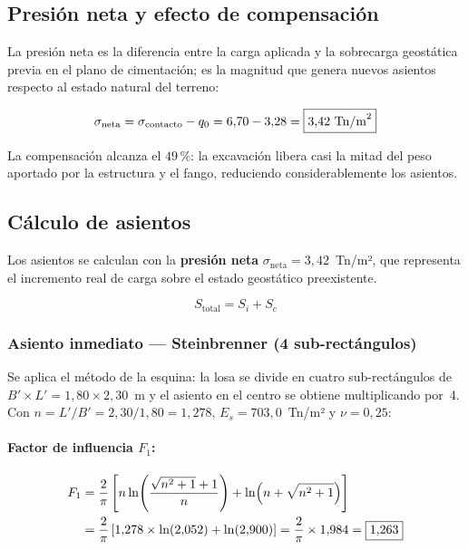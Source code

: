 \subsection{Presión neta y efecto de compensación}
\label{subsec:presion_neta}

La presión neta es la diferencia entre la carga aplicada y la sobrecarga
geostática previa en el plano de cimentación; es la magnitud que genera
nuevos asientos respecto al estado natural del terreno:

\[
  \sigma_\text{neta} = \sigma_\text{contacto} - q_0
    = 6{,}70 - 3{,}28 = \boxed{3{,}42~\text{Tn/m}^2}
\]

La compensación alcanza el $49$\,\%: la excavación libera casi la mitad del
peso aportado por la estructura y el fango, reduciendo considerablemente
los asientos.

\subsection{Cálculo de asientos}
\label{subsec:asientos_arqueta}

Los asientos se calculan con la \textbf{presión neta}
$\sigma_\text{neta}=3{,}42$~Tn/m², que representa el incremento real de carga
sobre el estado geostático preexistente.

\[
  S_\text{total} = S_i + S_c
\]

\subsubsection{Asiento inmediato --- Steinbrenner (4 sub-rectángulos)}

Se aplica el método de la esquina: la losa se divide en cuatro sub-rectángulos de
$B'\times L'=1{,}80\times2{,}30$~m y el asiento en el centro se obtiene multiplicando
por~4. Con $n=L'/B'=2{,}30/1{,}80=1{,}278$, $E_s=703{,}0$~Tn/m² y $\nu=0{,}25$:

\paragraph{Factor de influencia $F_1$:}
\begin{align*}
  F_1 &= \frac{2}{\pi}\left[n\ln\!\left(\frac{\sqrt{n^2+1}+1}{n}\right)
         + \ln\!\left(n+\sqrt{n^2+1}\right)\right]\\
      &= \frac{2}{\pi}\left[1{,}278\times\ln(2{,}052) + \ln(2{,}900)\right]
       = \frac{2}{\pi}\times1{,}984 = \boxed{1{,}263}
\end{align*}

